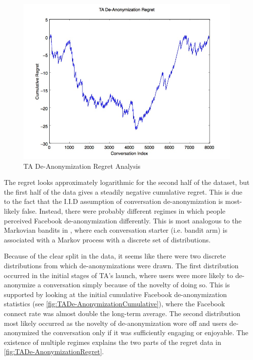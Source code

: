 \begin{figure}[H]
\centering
\includegraphics[trim= 0mm 0mm 0mm 0mm, clip, scale=0.5]{./Figures/TADe-AnonymizationRegret.jpg}
\caption{TA De-Anonymization Regret Analysis}
\label{fig:TADe-AnonymizationRegret}
\end{figure}

The regret looks approximately logarithmic for the second half of the dataset, but the first half of the data gives a steadily negative cumulative regret. This is due to the fact that the I.I.D assumption of conversation de-anonymization is most-likely false. Instead, there were probably different regimes in which people perceived Facebook de-anonymization differently. This is most analogous to the Markovian bandits in \cite{bubeck12}, where each conversation starter (i.e. bandit arm) is associated with a Markov process with a discrete set of distributions.

Because of the clear split in the data, it seems like there were two discrete distributions from which de-anonymizations were drawn. The first distribution occurred in the initial stages of TA's launch, where users were more likely to de-anonymize a conversation simply because of the novelty of doing so. This is supported by looking at the initial cumulative Facebook de-anonymization statistics (see \autoref{fig:TADe-AnonymizationCumulative}), where the Facebook connect rate was almost double the long-term average. The second distribution most likely occurred as the novelty of de-anonymization wore off and users de-anonymized the conversation only if it was sufficiently engaging or enjoyable. The existence of multiple regimes explains the two parts of the regret data in \autoref{fig:TADe-AnonymizationRegret}.

